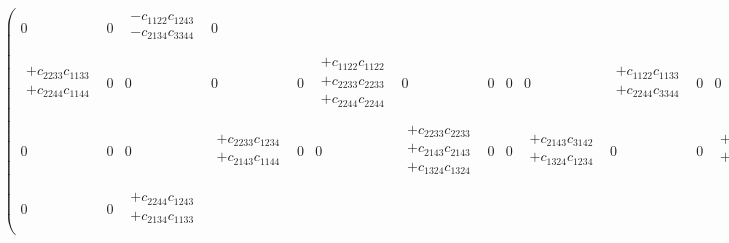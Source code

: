 \begin{eqnarray}
\begin{pmatrix}
0 &
0 &
\begin{array}{l}
-c_{1122}c_{1243} \\
-c_{2134}c_{3344} \\
\end{array} &
0 \\
\begin{array}{l}
+c_{2233}c_{1133} \\
+c_{2244}c_{1144} \\
\end{array} &
0 &
0 &
0 &
0 &
\begin{array}{l}
+c_{1122}c_{1122} \\
+c_{2233}c_{2233} \\
+c_{2244}c_{2244} \\
\end{array} &
0 &
0 &
0 &
0 &
\begin{array}{l}
+c_{1122}c_{1133} \\
+c_{2244}c_{3344} \\
\end{array} &
0 &
0 &
0 &
0 &
\begin{array}{l}
+c_{1122}c_{1144} \\
+c_{2233}c_{3344} \\
\end{array} \\
0 &
0 &
0 &
\begin{array}{l}
+c_{2233}c_{1234} \\
+c_{2143}c_{1144} \\
\end{array} &
0 &
0 &
\begin{array}{l}
+c_{2233}c_{2233} \\
+c_{2143}c_{2143} \\
+c_{1324}c_{1324} \\
\end{array} &
0 &
0 &
\begin{array}{l}
+c_{2143}c_{3142} \\
+c_{1324}c_{1234} \\
\end{array} &
0 &
0 &
\begin{array}{l}
+c_{2233}c_{3142} \\
+c_{1324}c_{1144} \\
\end{array} &
0 &
0 &
0 \\
0 &
0 &
\begin{array}{l}
+c_{2244}c_{1243} \\
+c_{2134}c_{1133} \\

\end{array}
\end{pmatrix}
\end{eqnarray}
